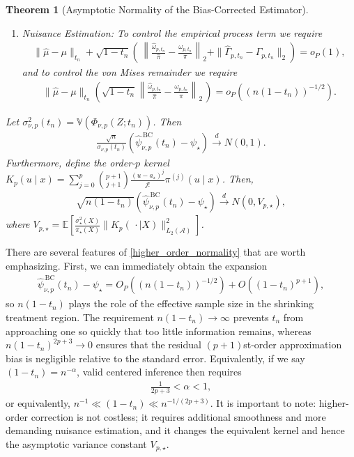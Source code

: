 \documentclass[11pt,twoside]{article}
\newtheorem{theorem}{Theorem}
\theoremstyle{definition}
\theoremstyle{remark}
\begin{document}
\begin{theorem}[Asymptotic Normality of the Bias-Corrected Estimator]
\begin{enumerate}
    \item[$(iv)$] \textit{Nuisance Estimation:} To control the empirical process term we require
    \begin{align*}
        \|\widehat\mu-\mu\|_{t_n} + \sqrt{1 - t_n} \left( \, \left\| \frac{\widehat\omega_{p,t_n}}{\widehat\pi} -\frac{\omega_{p,t_n}}{\pi} \right\|_2 + \|\widehat\Gamma_{p,t_n} - \Gamma_{p,t_n}\|_2 \right) = o_P(1),
    \end{align*}
    and to control the von Mises remainder we require
    \begin{align*}
        \|\widehat\mu-\mu\|_{t_n} \left( \sqrt{1 - t_n}\left\| \frac{\widehat\omega_{p,t_n}}{\widehat\pi} -\frac{\omega_{p,t_n}}{\pi} \right\|_2 \, \right) = o_P\left((n(1-t_n))^{-1/2}\right).
    \end{align*}
\end{enumerate}
Let $\sigma_{\nu,p}^2(t_n) =\mathbb{V}(\Phi_{\nu, p}(Z; t_n))$.
Then
\begin{align*}
    \frac{\sqrt{n}}{\sigma_{\nu,p}(t_n)} \left(\widehat\psi_{\nu,p}^{\,\mathrm{BC}}(t_n)-\psi_\star\right) \overset{d}{\longrightarrow}N(0,1).
\end{align*}
Furthermore, define the order-$p$ kernel $ K_p(u\mid x) =\sum_{j=0}^{p} \binom{p+1}{j+1}\frac{(u-a_\star)^j}{j!} \pi^{(j)}(u\mid x)$. Then,
\begin{align*}
    \sqrt{n(1-t_n)} \left(\widehat{\psi}_{\nu,p}^{\,\mathrm{BC}}(t_n)-\psi_\star\right) \overset{d}{\longrightarrow}N(0,V_{p,\star}),
\end{align*}
where $V_{p,\star} =\mathbb{E} \! \left[ \frac{\sigma_\star^2(X)}{\pi_\star(X)} \| K_p(\, \cdot \mid X) \|^2_{L_2(\mathcal{A})} \right]$.
\end{theorem}

There are several features of \cref{higher_order_normality} that are worth emphasizing. First, we can immediately obtain the expansion
\begin{align*}
     \widehat{\psi}_{\nu,p}^{\,\mathrm{BC}}(t_n)-\psi_\star = O_P\!\left((n(1-t_n))^{-1/2}\right) +O((1-t_n)^{p+1}),
\end{align*}
so $n(1 - t_n)$ plays the role of the effective sample size in the shrinking treatment region. The requirement $n(1 - t_n) \to\infty$ prevents $t_n$ from approaching one so quickly that too little information remains, whereas $n(1 - t_n)^{2p+3} \to 0$ ensures that the residual $(p+1)$st-order approximation bias is negligible relative to the standard error. Equivalently, if we say $(1 - t_n) = n^{-\alpha}$, valid centered inference then requires
\begin{align*}
    \frac{1}{2p+3}<\alpha<1,
\end{align*}
or equivalently, $n^{-1} \ll (1 - t_n) \ll n^{-1/(2p+3)}$. It is important to note: higher-order correction is not costless; it requires additional smoothness and more demanding nuisance estimation, and it changes the equivalent kernel and hence the asymptotic variance constant $V_{p,\star}$.
\end{document}
